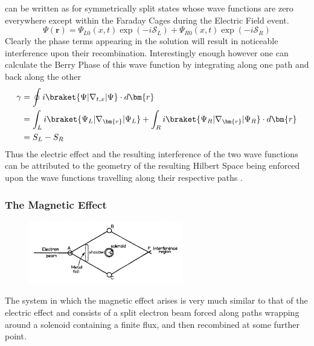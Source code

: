 \documentclass{article}
\begin{document}
can be written as for symmetrically split states whose wave functions are zero everywhere except within the Faraday Cages during the Electric Field event.
\begin{equation*}
  \Psi(\bm{r})=\Psi_{L0}(x,t)\exp(-i \mathcal{S}_{L}) + \Psi_{R0}(x,t)\exp(-i \mathcal{S}_{R})
\end{equation*}
Clearly the phase terms appearing in the solution will result in noticeable interference upon their recombination. Interestingly enough however one can calculate the Berry Phase of this wave function by integrating along one path and back along the other
\begin{align*}
  \gamma &= \oint i\braket{\Psi|\nabla_{t,x}|\Psi} \cdot d\bm{r}\\
         &= \int_{L} i\braket{\Psi_{L}|\nabla_{\bm{r}}|\Psi_{L}} + \int_{R} i\braket{\Psi_{R}|\nabla_{\bm{r}}|\Psi_{R}} \cdot d\bm{r}\\
         &= S_{L} - S_{R}
\end{align*}
Thus the electric effect and the resulting interference of the two wave functions can be attributed to the geometry of the resulting Hilbert Space being enforced upon the wave functions travelling along their respective paths \cite{Aharonov1959}.

\subsubsection{The Magnetic Effect}\label{sssec:magnetic_effect}

\begin{figure}[h]
  \centering
  \includegraphics[width=0.6\textwidth]{magnetic_effect}
  \label{fig:AME}
\end{figure}

The system in which the magnetic effect arises is very much similar to that of the electric effect and consists of a split electron beam forced along paths wrapping around a solenoid containing a finite flux, and then recombined at some further point.\\
\end{document}
